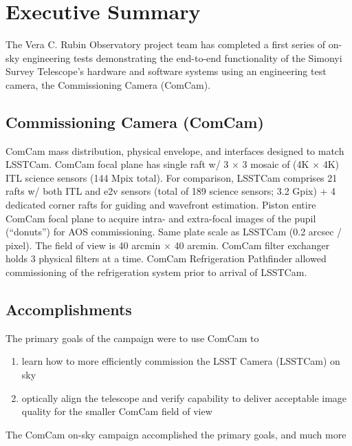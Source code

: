 \section{Executive Summary}
\label{sec:summary}

The Vera C. Rubin Observatory project team has completed a first series of on-sky engineering tests demonstrating the end-to-end functionality of the Simonyi Survey Telescope's hardware and software systems using an engineering test camera, the Commissioning Camera (ComCam).

\subsection{Commissioning Camera (ComCam)}

ComCam mass distribution, physical envelope, and interfaces designed to match LSSTCam.
ComCam focal plane has single raft w/ 3 $\times$ 3 mosaic of (4K $\times$ 4K) ITL science sensors (144 Mpix total).
For comparison, LSSTCam comprises 21 rafts w/ both ITL and e2v sensors (total of 189 science sensors; 3.2 Gpix) + 4 dedicated corner rafts for guiding and wavefront estimation.
Piston entire ComCam focal plane to acquire intra- and extra-focal images of the pupil (``donuts'') for AOS commissioning.
Same plate scale as LSSTCam (0.2 arcsec / pixel).
The field of view is 40 arcmin $\times$ 40 arcmin.
ComCam filter exchanger holds 3 physical filters at a time.
ComCam Refrigeration Pathfinder allowed commissioning of the refrigeration system prior to arrival of LSSTCam.

\subsection{Accomplishments}

The primary goals of the campaign were to use ComCam to

\begin{enumerate}
    \item learn how to more efficiently commission the LSST Camera (LSSTCam) on sky
    \item optically align the telescope and verify capability to deliver acceptable image quality for the smaller ComCam field of view
\end{enumerate}

The ComCam on-sky campaign accomplished the primary goals, and much more

